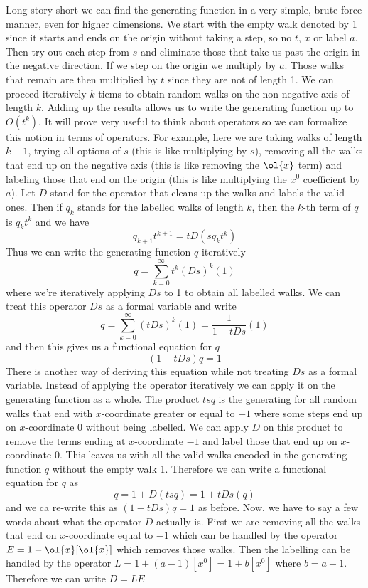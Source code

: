 Long story short we can find the generating function in a very simple, brute force manner, even for higher dimensions. We start with the empty walk denoted by 1 since it starts and ends on the origin without taking a step, so no $t$, $x$ or label $a$. Then try out each step from $s$ and eliminate those that take us past the origin in the negative direction. If we step on the origin we multiply by $a$. Those walks that remain are then multiplied by $t$ since they are not of length 1. We can proceed iteratively $k$ tiems to obtain random walks on the non-negative axis of length $k$. Adding up the results allows us to write the generating function up to $O(t^k)$. It will prove very useful to think about operators so we can formalize this notion in terms of operators. For example, here we are taking walks of length $k-1$, trying all options of $s$ (this is like multiplying by $s$), removing all the walks that end up on the negative axis (this is like removing the $\ol{x}$ term) and labeling those that end on the origin (this is like multiplying the $x^0$ coefficient by $a$). Let $D$ stand for the operator that cleans up the walks and labels the valid ones. Then if $q_k$ stands for the labelled walks of length $k$, then the $k$-th term of $q$ is $q_k t^k$ and we have
\[
	q_{k+1}t^{k+1} = t D (s q_k t^k)
\]
Thus we can write the generating function $q$ iteratively
\[
	q = \sum_{k=0}^\infty t^k(Ds)^k(1)
\]
where we're iteratively applying $Ds$ to 1 to obtain all labelled walks. We can treat this operator $Ds$ as a formal variable and write
\[
	q = \sum_{k=0}^\infty (tDs)^k(1) = \frac{1}{1-tDs}(1)
\]
and then this gives us a functional equation for $q$
\[
	(1-tDs)q  =1 
\]
There is another way of deriving this equation while not treating $Ds$ as a formal variable. Instead of applying the operator iteratively we can apply it on the generating function as a whole. The product $tsq$ is the generating for all random walks that end with $x$-coordinate greater or equal to $-1$ where some steps end up on $x$-coordinate 0 without being labelled. We can apply $D$ on this product to remove the terms ending at $x$-coordinate $-1$ and label those that end up on $x$-coordinate 0. This leaves us with all the valid walks encoded in the generating function $q$ without the empty walk 1. Therefore we can write a functional equation for $q$ as
\[
	q = 1 + D(tsq) = 1 + tDs(q)
\]
and we ca re-write this as $(1-tDs)q  =1$ as before. Now, we have to say a few words about what the operator $D$ actually is. First we are removing all the walks that end on $x$-coordinate equal to $-1$ which can be handled by the operator $E = 1 - \ol{x}[\ol{x}]$ which removes those walks. Then the labelling can be handled by the operator $L = 1 + (a-1) [x^0] = 1 + b[x^0]$ where $b = a-1$. Therefore we can write $D  = LE$
